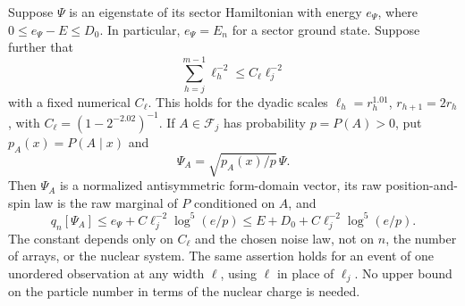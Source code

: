 \begin{lemma}\label{lem:obs-tilt}
Suppose $\Psi$ is an eigenstate of its sector Hamiltonian with
energy $e_\Psi$, where $0\le e_\Psi-E\le D_0$. In particular,
$e_\Psi=E_n$ for a sector ground state. Suppose further that
\[
 \sum_{h=j}^{m-1}\ell_h^{-2}\le C_\ell\ell_j^{-2}
\]
with a fixed numerical $C_\ell$. This holds for the dyadic scales
$\ell_h=r_h^{1.01}$, $r_{h+1}=2r_h$, with
$C_\ell=(1-2^{-2.02})^{-1}$. If $A\in\mathcal F_j$ has probability
$p=P(A)>0$, put $p_A(x)=P(A\mid x)$ and
\[
 \Psi_A=\sqrt{p_A(x)/p}\,\Psi.
\]
Then $\Psi_A$ is a normalized antisymmetric form-domain vector,
its raw position-and-spin law is the raw marginal of $P$ conditioned
on $A$, and
\begin{equation}\label{eq:obs-tilt}
 q_n[\Psi_A]\le e_\Psi+C\ell_j^{-2}\log^5(e/p)
       \le E+D_0+C\ell_j^{-2}\log^5(e/p).
\end{equation}
The constant depends only on $C_\ell$ and the chosen noise law,
not on $n$, the number of arrays, or the nuclear system. The same
assertion holds for an event of one unordered observation at any
width $\ell$, using $\ell$ in place of $\ell_j$. No upper bound
on the particle number in terms of the nuclear charge is needed.
\end{lemma}

